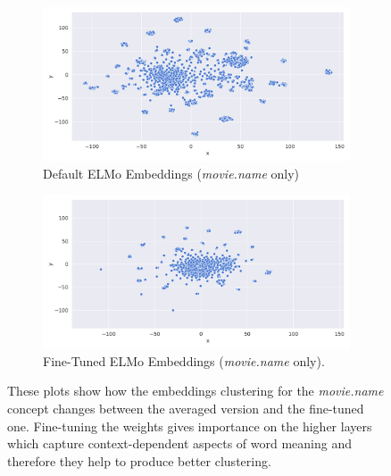\documentclass[11pt,a4paper]{article}
\begin{document}
\begin{figure}[t]
\begin{subfigure}{0.5\linewidth}
  \centering
  \includegraphics[width=\linewidth]{img/elmo-embeddings-not-trained-2D.png}
  \caption{Default ELMo Embeddings (\textit{movie.name} only)}
  \label{fig:sfig1}
\end{subfigure}%
\begin{subfigure}{0.5\linewidth}
  \centering
  \includegraphics[width=\linewidth]{img/elmo-embeddings-trained-2D.png}
  \caption{Fine-Tuned ELMo Embeddings (\textit{movie.name} only).}
  \label{fig:sfig2}
\end{subfigure}%
\caption{These plots show how the embeddings clustering for the \textit{movie.name} concept changes between the averaged version and the fine-tuned one. Fine-tuning the weights gives importance on the higher layers which capture context-dependent aspects of word meaning and therefore they help to produce better clustering.}
\label{fig:fine-tuned-emb}
\end{figure}
\end{document}
